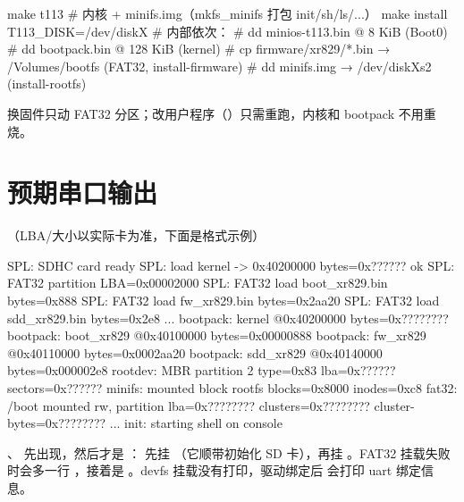 \begin{shcode}
make t113                    # 内核 + minifs.img（mkfs_minifs 打包 init/sh/ls/...）
make install T113_DISK=/dev/diskX
# 内部依次：
#   dd minios-t113.bin  @ 8 KiB    (Boot0)
#   dd bootpack.bin     @ 128 KiB  (kernel)
#   cp firmware/xr829/*.bin → /Volumes/bootfs   (FAT32, install-firmware)
#   dd minifs.img → /dev/diskXs2                (install-rootfs)
\end{shcode}

换固件只动 FAT32 分区；改用户程序（）只需重跑，内核和 bootpack 不用重烧。

\section{预期串口输出}

（LBA/大小以实际卡为准，下面是格式示例）

\begin{txtcode}[basicstyle=\ttfamily\scriptsize]
SPL: SDHC card ready
SPL: load kernel -> 0x40200000 bytes=0x?????? ok
SPL: FAT32 partition LBA=0x00002000
SPL: FAT32 load boot_xr829.bin bytes=0x888
SPL: FAT32 load fw_xr829.bin bytes=0x2aa20
SPL: FAT32 load sdd_xr829.bin bytes=0x2e8
...
bootpack: kernel @0x40200000 bytes=0x????????
bootpack: boot_xr829 @0x40100000 bytes=0x00000888
bootpack: fw_xr829 @0x40110000 bytes=0x0002aa20
bootpack: sdd_xr829 @0x40140000 bytes=0x000002e8
rootdev: MBR partition 2 type=0x83 lba=0x?????? sectors=0x??????
minifs: mounted block rootfs blocks=0x8000 inodes=0xc8
fat32: /boot mounted rw, partition lba=0x???????? clusters=0x???????? cluster-bytes=0x????????
...
init: starting shell on console
\end{txtcode}

、 先出现，然后才是 ： 先挂 \file{/}（它顺带初始化 SD 卡），再挂 。FAT32 挂载失败时会多一行 ，接着是 。devfs 挂载没有打印，驱动绑定后  会打印 uart 绑定信息。

